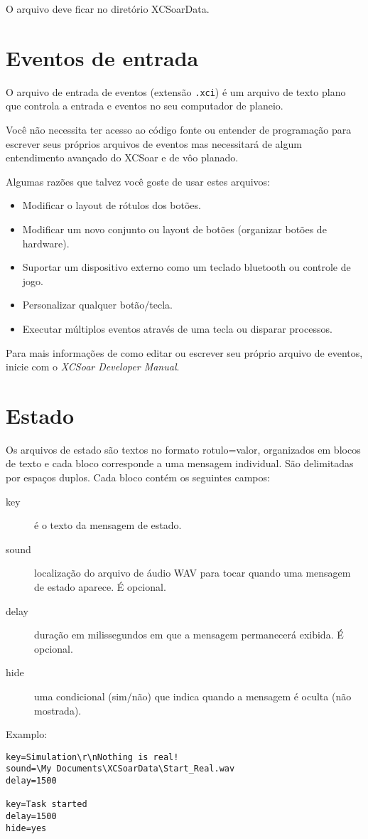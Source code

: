 O arquivo deve ficar no diretório  XCSoarData.


\section{Eventos de entrada}

O arquivo de entrada de eventos (extensão \verb|.xci|) é um arquivo de texto plano que controla a entrada e eventos no seu computador de planeio.

Você não necessita ter acesso ao código fonte ou entender de programação para escrever seus próprios arquivos de eventos mas necessitará de algum entendimento avançado do XCSoar e de vôo planado.

Algumas razões que talvez você goste de usar estes arquivos:

\begin{itemize}
\item Modificar o layout de rótulos dos botões.
\item Modificar um novo conjunto ou layout de botões (organizar botões de hardware).
\item Suportar um dispositivo externo como um teclado bluetooth ou controle de jogo.
\item Personalizar qualquer botão/tecla.
\item Executar múltiplos eventos através de uma tecla ou disparar processos.
\end{itemize}
Para mais informações de como editar ou escrever seu próprio arquivo de eventos, inicie com o {\em XCSoar Developer Manual}.


\section{Estado}\label{sec:status-file}

Os arquivos de estado são textos no formato rotulo=valor, organizados em blocos de texto e cada bloco corresponde a uma mensagem individual.  São delimitadas por espaços duplos.  Cada bloco contém os seguintes campos:
\begin{description}
\item[key]  é o texto da mensagem de estado.
\item[sound] localização do arquivo de áudio WAV para tocar quando uma mensagem de estado aparece.  É opcional.
\item[delay] duração em milissegundos em que a mensagem permanecerá exibida.  É opcional.
\item[hide] uma condicional (sim/não) que indica quando a mensagem é oculta (não mostrada).
\end{description} 

Examplo:
\begin{verbatim}
key=Simulation\r\nNothing is real!
sound=\My Documents\XCSoarData\Start_Real.wav
delay=1500

key=Task started
delay=1500
hide=yes
\end{verbatim}
% 
